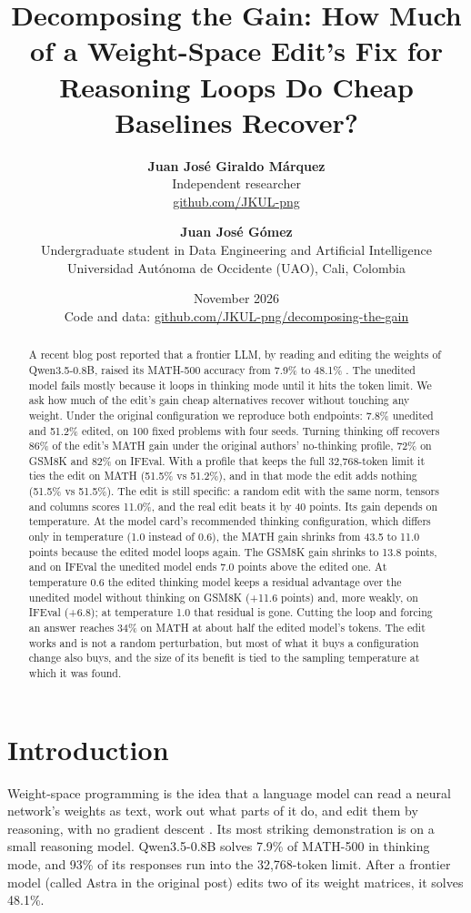 \documentclass[11pt]{article}
\title{Decomposing the Gain: How Much of a Weight-Space Edit's Fix for Reasoning Loops Do Cheap Baselines Recover?}
\author{%
  \textbf{Juan Jos\'e Giraldo M\'arquez}\\
  Independent researcher\\
  \href{https://github.com/JKUL-png}{github.com/JKUL-png}
  \and
  \textbf{Juan Jos\'e G\'omez}\\
  Undergraduate student in Data Engineering and Artificial Intelligence\\
  Universidad Aut\'onoma de Occidente (UAO), Cali, Colombia
}
\date{November 2026\\[.6em]
  \small Code and data: \href{https://github.com/JKUL-png/decomposing-the-gain}{github.com/JKUL-png/decomposing-the-gain}}
\begin{document}
\maketitle

\begin{abstract}
A recent blog post reported that a frontier LLM, by reading and editing the weights of Qwen3.5-0.8B, raised its MATH-500 accuracy from 7.9\% to 48.1\% \citep{takehi2026}. The unedited model fails mostly because it loops in thinking mode until it hits the token limit. We ask how much of the edit's gain cheap alternatives recover without touching any weight. Under the original configuration we reproduce both endpoints: 7.8\% unedited and 51.2\% edited, on 100 fixed problems with four seeds. Turning thinking off recovers 86\% of the edit's MATH gain under the original authors' no-thinking profile, 72\% on GSM8K and 82\% on IFEval. With a profile that keeps the full 32,768-token limit it ties the edit on MATH (51.5\% vs 51.2\%), and in that mode the edit adds nothing (51.5\% vs 51.5\%). The edit is still specific: a random edit with the same norm, tensors and columns scores 11.0\%, and the real edit beats it by 40 points. Its gain depends on temperature. At the model card's recommended thinking configuration, which differs only in temperature (1.0 instead of 0.6), the MATH gain shrinks from 43.5 to 11.0 points because the edited model loops again. The GSM8K gain shrinks to 13.8 points, and on IFEval the unedited model ends 7.0 points above the edited one. At temperature 0.6 the edited thinking model keeps a residual advantage over the unedited model without thinking on GSM8K (+11.6 points) and, more weakly, on IFEval (+6.8); at temperature 1.0 that residual is gone. Cutting the loop and forcing an answer reaches 34\% on MATH at about half the edited model's tokens. The edit works and is not a random perturbation, but most of what it buys a configuration change also buys, and the size of its benefit is tied to the sampling temperature at which it was found.

\end{abstract}

\section{Introduction}\label{sec:1}

Weight-space programming is the idea that a language model can read a neural network's weights as text, work out what parts of it do, and edit them by reasoning, with no gradient descent \citep{takehi2026}. Its most striking demonstration is on a small reasoning model. Qwen3.5-0.8B solves 7.9\% of MATH-500 in thinking mode, and 93\% of its responses run into the 32,768-token limit. After a frontier model (called Astra in the original post) edits two of its weight matrices, it solves 48.1\%.
\end{document}
